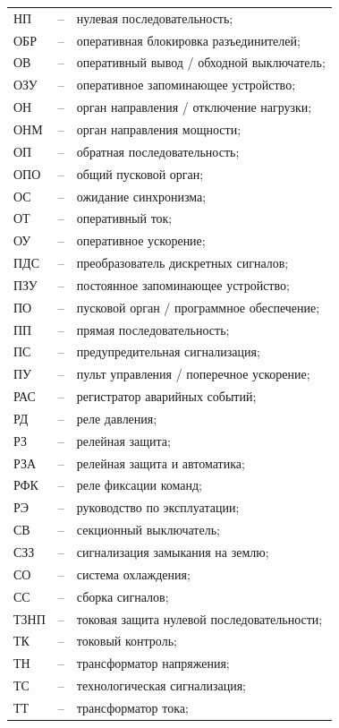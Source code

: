 \begin{longtable}{>{\raggedright\arraybackslash}m{2cm}>{\raggedright\arraybackslash}m{0.5cm}>{\raggedright\arraybackslash}m{20cm}}
НП & -- & нулевая последовательность; \\
ОБР & -- & оперативная блокировка разъединителей; \\
ОВ & -- & оперативный вывод / обходной выключатель; \\
ОЗУ & -- & оперативное запоминающее устройство; \\
ОН & -- & орган направления / отключение нагрузки; \\
ОНМ & -- & орган направления мощности; \\
ОП & -- & обратная последовательность; \\
ОПО & -- & общий пусковой орган; \\
ОС & -- & ожидание синхронизма; \\
ОТ & -- & оперативный ток; \\
ОУ & -- & оперативное ускорение; \\
ПДС & -- & преобразователь дискретных сигналов; \\
ПЗУ & -- & постоянное запоминающее устройство; \\
ПО & -- & пусковой орган / программное обеспечение; \\
ПП & -- & прямая последовательность; \\
ПС & -- & предупредительная сигнализация; \\
ПУ & -- & пульт управления / поперечное ускорение; \\
РАС & -- & регистратор аварийных событий; \\
РД & -- & реле давления; \\
РЗ & -- & релейная защита; \\
РЗА & -- & релейная защита и автоматика; \\
РФК & -- & реле фиксации команд; \\
РЭ & -- & руководство по эксплуатации; \\
СВ & -- & секционный выключатель; \\
СЗЗ & -- & сигнализация замыкания на землю; \\
СО & -- & система охлаждения; \\
СС & -- & сборка сигналов; \\
ТЗНП & -- & токовая защита нулевой последовательности; \\
ТК & -- & токовый контроль; \\
ТН & -- & трансформатор напряжения; \\
ТС & -- & технологическая сигнализация; \\
ТТ & -- & трансформатор тока; \\

\end{longtable}
